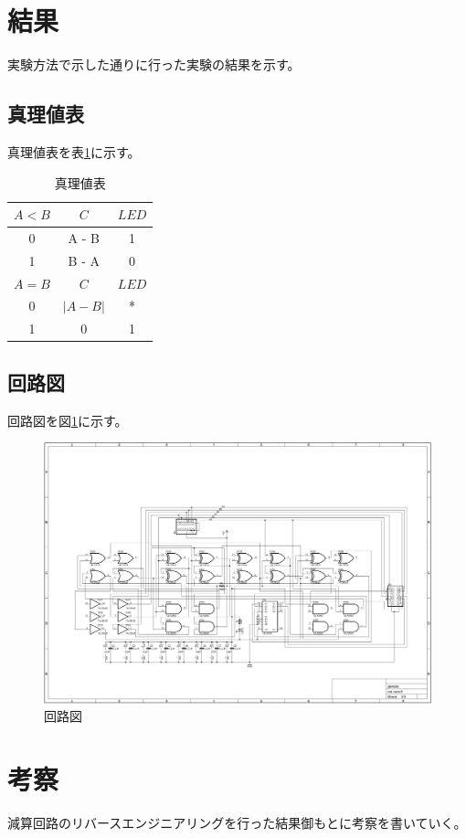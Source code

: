 \documentclass[a4paper,11pt]{ltjsarticle}
\begin{document}
\section{結果}
実験方法で示した通りに行った実験の結果を示す。
\subsection{真理値表}
真理値表を表\ref{tab:truth}に示す。
\begin{table}[htbp]
    \centering
    \caption{真理値表}
    \begin{tabular}{c|c|c}
        \hline
        $A < B$ & $C$ & $LED$ \\
        \hline
        0 & A - B & 1 \\
        1 & B - A & 0 \\
        \hline
        \hline
        $A = B$ & $C$ & $LED$ \\
        \hline
        0 & $|A - B|$ & * \\
        1 & 0 & 1 \\
        \hline
    \end{tabular}
    \label{tab:truth}
\end{table}
\subsection{回路図}
回路図を図\ref{fig:circ}に示す。
\begin{figure}[htbp]
    \centering
    \includegraphics[angle=90,width=\columnwidth]{./image/genzan.png}
    \caption{回路図}
    \label{fig:circ}
\end{figure}
\newpage
\section{考察}
減算回路のリバースエンジニアリングを行った結果御もとに考察を書いていく。
\end{document}
